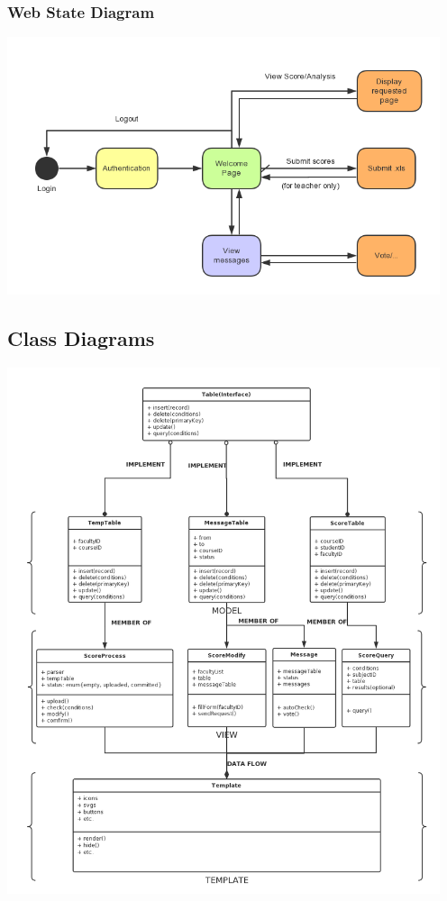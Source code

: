 \documentclass[a4]{article}
\begin{document}
\subsubsection{Web State Diagram}
\includegraphics[width=5in]{pic/3-2.png}

\subsection{Class Diagrams}
\includegraphics[width=5in]{pic/4.png}
\end{document}
